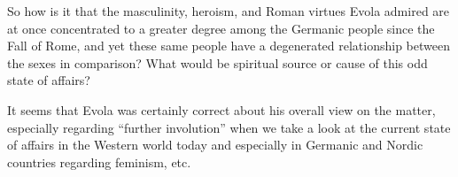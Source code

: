\begin{footnotesize}
\begin{sffamily}
So how is it that the masculinity, heroism, and Roman virtues Evola admired are at once concentrated to a greater degree among the Germanic people since the Fall of Rome, and yet these same people have a degenerated relationship between the sexes in comparison? What would be spiritual source or cause of this odd state of affairs?

It seems that Evola was certainly correct about his overall view on the matter, especially regarding ``further involution'' when we take a look at the current state of affairs in the Western world today and especially in Germanic and Nordic countries regarding feminism, etc.

\end{sffamily}
\end{footnotesize}

